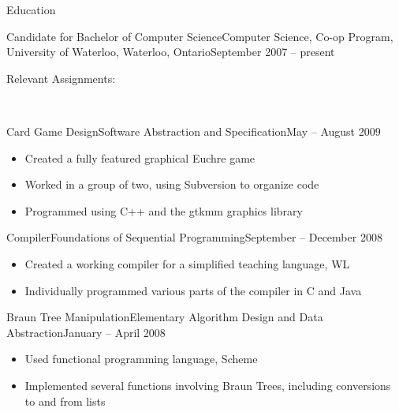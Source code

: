 \documentclass[11pt]{article}
\begin{document}
	\begin{section}{Education} \\
	
		\begin{subsection}{Candidate for Bachelor of Computer Science}{Computer Science, Co-op Program, University of Waterloo, Waterloo, Ontario}{September 2007 -- present}
		
			\begin{indent}
				\begin{bf}Relevant Assignments:\end{bf} \\
				
				\begin{subsection}{Card Game Design}{Software Abstraction and Specification}{May -- August 2009}
				
					\begin{itemize}
						\item Created a fully featured graphical Euchre game
						\item Worked in a group of two, using Subversion to organize code
						\item Programmed using C++ and the gtkmm graphics library
					\end{itemize}
					
				\end{subsection}
				
				\begin{subsection}{Compiler}{Foundations of Sequential Programming}{September -- December 2008}
				
					\begin{itemize}
						\item Created a working compiler for a simplified teaching language, WL
						\item Individually programmed various parts of the compiler in C and Java
					\end{itemize}
				
				\end{subsection}
				
				\begin{subsection}{Braun Tree Manipulation}{Elementary Algorithm Design and Data Abstraction}{January -- April 2008}
				
					\begin{itemize}
						\item Used functional programming language, Scheme
						\item Implemented several functions involving Braun Trees, including conversions to and from lists
					\end{itemize}
					

\end{subsection}
\end{indent}
\end{subsection}
\end{section}
\end{document}
